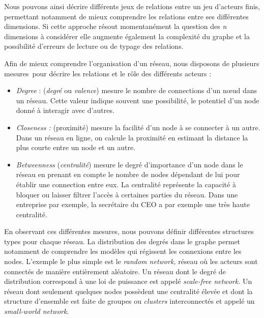 Nous pouvons ainsi décrire différents jeux de relations entre un jeu d{\textquoteright}acteurs finis, permettant notamment de mieux comprendre les relations entre ses différentes dimensions. Si cette approche résout momentanément la question des \textit{n }dimensions à considérer \citep{Brodka2013} elle augmente également la complexité du graphe et la possibilité d{\textquoteright}erreurs de lecture ou de typage des relations.

Afin de mieux comprendre l{\textquoteright}organisation d{\textquoteright}un réseau, nous disposons de plusieurs mesures~pour décrire les relations et le r\^ole des différents acteurs :

\begin{itemize}
\item \textit{Degree} : (\textit{degré} ou \textit{valence}) mesure le nombre de connections d{\textquoteright}un n{\oe}ud dans un réseau. Cette valeur indique souvent une possibilité, le potentiel d{\textquoteright}un node donné à interagir avec d{\textquoteright}autres.  
\item \textit{Closeness : }(proximité) mesure la facilité d{\textquoteright}un node à se connecter à un autre. Dans un réseau en ligne, on calcule la proximité en estimant la distance la plus courte entre un node et un autre. 
\item \textit{Betweenness} (\textit{centralité}) mesure le degré d{\textquoteright}importance d{\textquoteright}un node dans le réseau en prenant en compte le nombre de nodes dépendant de lui pour
établir une connection entre eux. La centralité représente la capacité à bloquer ou laisser filtrer l{\textquoteright}accès à certaines parties du réseau. Dans une entreprise par exemple, la secrétaire du CEO a par exemple une très haute centralité.
\end{itemize}

En observant ces différentes mesures, nous pouvons définir différentes structures types pour chaque réseau. La distribution des degrés dans le graphe permet notamment de comprendre les modèles qui régissent les connexions entre les nodes. L{\textquoteright}exemple le plus simple est le \textit{random network, }réseau o\`u les acteurs sont connectés de manière entièrement aléatoire. Un réseau dont le degré de distribution correspond à une loi de puissance est appelé \textit{scale-free network. }Un réseau dont seulement quelques nodes possèdent une centralité élevée et dont la structure d{\textquoteright}ensemble est faite de groupes ou \textit{clusters} interconnectés et appelé un \textit{small-world network}.

